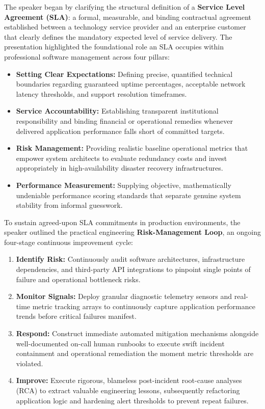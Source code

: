 The speaker began by clarifying the structural definition of a
\textbf{Service Level Agreement (SLA)}: a formal, measurable, and
binding contractual agreement established between a technology service
provider and an enterprise customer that clearly defines the mandatory
expected level of service delivery. The presentation highlighted the
foundational role an SLA occupies within professional software
management across four pillars:

\begin{itemize}
\tightlist
\item
  \textbf{Setting Clear Expectations:} Defining precise, quantified
  technical boundaries regarding guaranteed uptime percentages,
  acceptable network latency thresholds, and support resolution
  timeframes.
\item
  \textbf{Service Accountability:} Establishing transparent
  institutional responsibility and binding financial or operational
  remedies whenever delivered application performance falls short of
  committed targets.
\item
  \textbf{Risk Management:} Providing realistic baseline operational
  metrics that empower system architects to evaluate redundancy costs
  and invest appropriately in high-availability disaster recovery
  infrastructures.
\item
  \textbf{Performance Measurement:} Supplying objective, mathematically
  undeniable performance scoring standards that separate genuine system
  stability from informal guesswork.
\end{itemize}

To sustain agreed-upon SLA commitments in production environments, the
speaker outlined the practical engineering \textbf{Risk-Management
Loop}, an ongoing four-stage continuous improvement cycle:

\begin{enumerate}
\def\labelenumi{\arabic{enumi}.}
\tightlist
\item
  \textbf{Identify Risk:} Continuously audit software architectures,
  infrastructure dependencies, and third-party API integrations to
  pinpoint single points of failure and operational bottleneck risks.
\item
  \textbf{Monitor Signals:} Deploy granular diagnostic telemetry sensors
  and real-time metric tracking arrays to continuously capture
  application performance trends before critical failures manifest.
\item
  \textbf{Respond:} Construct immediate automated mitigation mechanisms
  alongside well-documented on-call human runbooks to execute swift
  incident containment and operational remediation the moment metric
  thresholds are violated.
\item
  \textbf{Improve:} Execute rigorous, blameless post-incident root-cause
  analyses (RCA) to extract valuable engineering lessons, subsequently
  refactoring application logic and hardening alert thresholds to
  prevent repeat failures.
\end{enumerate}


